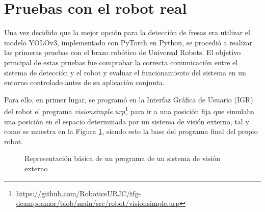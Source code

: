 \section{Pruebas con el robot real}
\label{Pruebas_UR}

Una vez decidido que la mejor opción para la detección de fresas era utilizar el modelo YOLOv3, implementado con PyTorch en Python, se procedió a realizar las primeras pruebas con el brazo robótico de Universal Robots. El objetivo principal de estas pruebas fue comprobar la correcta comunicación entre el sistema de detección y el robot y evaluar el funcionamiento del sistema en un entorno controlado antes de su aplicación conjunta.

Para ello, en primer lugar, se programó en la Interfaz Gráfica de Usuario (IGR) del robot el programa \textit{visionsimple.urp}\footnote{\url{https://github.com/RoboticsURJC/tfg-dcampoamor/blob/main/src/robot/visionsimple.urp}} para ir a una posición fija que simulaba una posición en el espacio determinada por un sistema de visión externo, tal y como se muestra en la Figura \ref{fig:visionsimple}, siendo esto la base del programa final del propio robot.

   \begin{figure}[H]
      \begin{center}
        \subcapcentertrue
        \hspace{1mm}
      \end{center}
      \caption{Representación básica de un programa de un sistema de visión externo}
      \label{fig:visionsimple}
    \end{figure}

